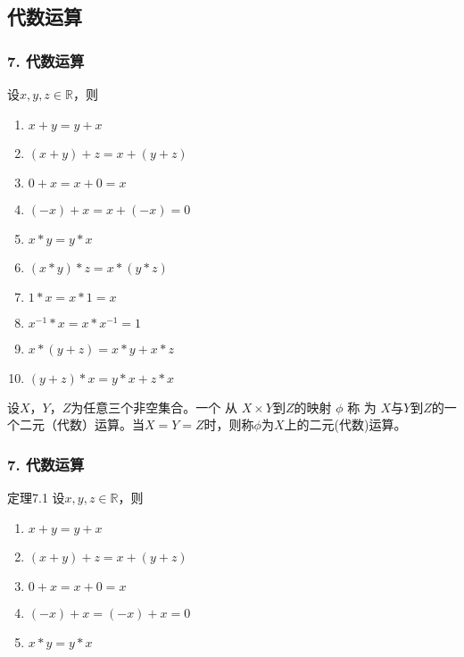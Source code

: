 \documentclass{beamer}
\begin{document}
\begin{CJK*}{UTF8}{gbsn}
\section{代数运算}
\begin{frame}
  \frametitle{7. 代数运算}
  \begin{minipage}[t]{0.5\linewidth}
    
  \begin{Thm}
    设$x, y, z \in \mathbb{R}$，则
   \begin{enumerate}
   \item   $x + y = y + x$
   \item   $(x + y) + z = x + (y + z)$
   \item   $0 + x = x + 0 = x$
   \item   $(-x) + x =x + (-x) = 0$
   \item   $x * y = y * x$
   \item   $(x * y) * z = x * (y *z)$
   \item   $1 * x = x * 1 = x$
   \item   $x^{-1} * x = x * x^{-1} = 1$
   \item   $x* (y + z) = x * y + x * z$
   \item   $(y + z) * x = y * x + z * x$
    \end{enumerate}
  \end{Thm}
\end{minipage}\pause
\begin{minipage}[t]{0.5\linewidth}
  \begin{Def}
    设$X$，$Y$，$Z$为任意三个非空集合。一个 从 $X\times Y$到$Z$的映射 $\phi$ 称 为 $X$与$Y$到$Z$的一个\alert{二元（代数）运算}。当$X=Y=Z$时，则称$\phi$为$X$上的\alert{二元(代数)运算}。
  \end{Def}
\end{minipage}
\end{frame}
\begin{frame}
  \frametitle{7. 代数运算}
  \begin{minipage}[t]{0.49\linewidth}
  \begin{block}{定理7.1}
    设$x, y, z \in \mathbb{R}$，则
   \begin{enumerate}
   \item   $x + y = y + x$
   \item   $(x + y) + z = x + (y + z)$
   \item   $0 + x = x + 0 = x$
   \item   $(-x) + x = (-x) + x = 0$
   \item   $x * y = y * x$

\end{enumerate}
\end{block}
\end{minipage}
\end{frame}
\end{CJK*}
\end{document}

